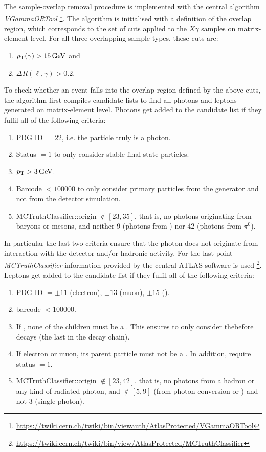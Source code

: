 The sample-overlap removal procedure is implemented with the central algorithm
\emph{VGammaORTool}%
\footnote{\url{https://twiki.cern.ch/twiki/bin/viewauth/AtlasProtected/VGammaORTool}}.
The algorithm is initialised with a definition of the overlap region, which corresponds to the set of cuts applied to the $X\gamma$ samples on matrix-element level.
For all three overlapping sample types, these cuts are:
%
\begin{enumerate}
\item $\pT (\gamma) > \SI{15}{\GeV}$ and
\item $\Delta R(\ell, \gamma) > 0.2$.
\end{enumerate}
%
To check whether an event falls into the overlap region defined by the above cuts, the algorithm first compiles candidate lists to find all photons and leptons generated on matrix-element level.
Photons get added to the candidate list if they fulfil all of the following criteria:
%
\begin{enumerate}
\item PDG ID $= 22$, i.e. the particle truly is a photon.
\item Status $= 1$ to only consider stable final-state particles.
\item $\pT > \SI{3}{\GeV}$.
\item Barcode $< \num{100000}$ to only consider primary particles from the generator and not from the detector simulation.
\item MCTruthClassifier::origin $\notin [23, 35]$, that is, no photons originating from baryons or mesons, and neither 9 (photons from \tauleptons) nor 42 (photons from $\pi^0$).
\end{enumerate}
%
In particular the last two criteria ensure that the photon does not originate from interaction with the detector and/or hadronic activity.
For the last point \emph{MCTruthClassifier} information provided by the central ATLAS software is used%
\footnote{\url{https://twiki.cern.ch/twiki/bin/view/AtlasProtected/MCTruthClassifier}}.
Leptons get added to the candidate list if they fulfil all of the following criteria:
%
\begin{enumerate}
\item PDG ID $= \pm 11$ (electron), $\pm 13$ (muon), $\pm 15$ (\taulepton).
\item barcode $< \num{100000}$.
\item If \taulepton, none of the children must be a \taulepton. This ensures to only consider the\tauleptons before decays (the last \taulepton in the decay chain).
\item If electron or muon, its parent particle must not be a \taulepton. In addition, require status $= 1$.
\item MCTruthClassifier::origin $\notin [23, 42]$, that is, no photons from a hadron or any kind of radiated photon, and $\notin [5, 9]$ (from photon conversion or \taulepton) and not 3 (single photon).
\end{enumerate}

